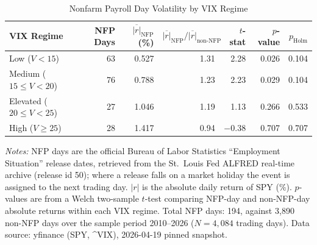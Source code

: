 \documentclass[12pt,a4paper]{article}
\begin{document}
\begin{table}[H]
\centering
\caption{Nonfarm Payroll Day Volatility by VIX Regime}
\label{tab:nfp}
\begin{threeparttable}
\begin{tabular}{lrrrrrr}
\toprule
VIX Regime & NFP Days & $\overline{|r|}_{\text{NFP}}$ (\%) & $\overline{|r|}_{\text{NFP}} / \overline{|r|}_{\text{non-NFP}}$ & $t$-stat & $p$-value & $p_{\text{Holm}}$ \\
\midrule
Low ($V < 15$)              & 63  & 0.527 & 1.31 & 2.28 & 0.026 & 0.104 \\ %
Medium ($15 \leq V < 20$)   & 76  & 0.788 & 1.23 & 2.23 & 0.029 & 0.104 \\
Elevated ($20 \leq V < 25$) & 27  & 1.046 & 1.19 & 1.13 & 0.266 & 0.533 \\
High ($V \geq 25$)          & 28  & 1.417 & 0.94 & $-0.38$ & 0.707 & 0.707 \\
\bottomrule
\end{tabular}
\begin{tablenotes}
\small
\item \textit{Notes:} NFP days are the official Bureau of Labor Statistics ``Employment Situation'' release dates, retrieved from the St.\ Louis Fed ALFRED real-time archive (release id 50); where a release falls on a market holiday the event is assigned to the next trading day. $|r|$ is the absolute daily return of SPY (\%). $p$-values are from a Welch two-sample $t$-test comparing NFP-day and non-NFP-day absolute returns within each VIX regime. Total NFP days: 194, against 3{,}890 non-NFP days over the sample period 2010--2026 ($N = 4{,}084$ trading days). Data source: yfinance (SPY, \^{}VIX), 2026-04-19 pinned snapshot. %

\end{tablenotes}
\end{threeparttable}
\end{table}
\end{document}
